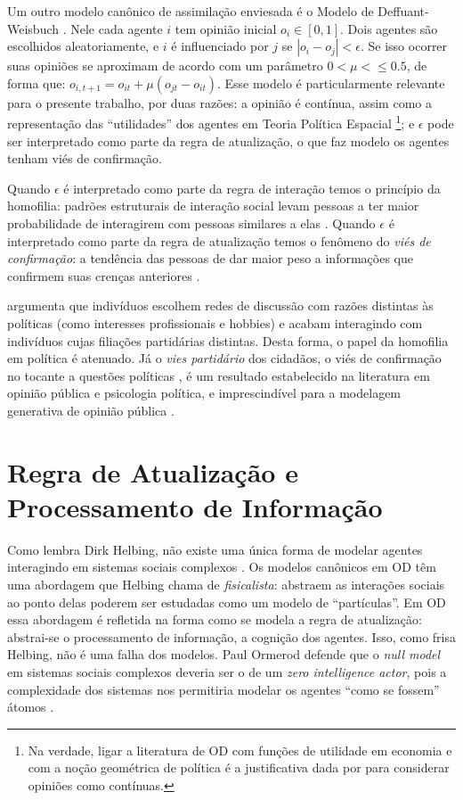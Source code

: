 Um outro modelo canônico de assimilação enviesada é o Modelo de
Deffuant-Weisbuch \cite{deffuant2000mixing}. Nele cada agente \(i\) tem opinião
inicial \( o_i \in [0,1]\). Dois agentes são escolhidos aleatoriamente, e \(i\) é
influenciado por \(j\) se \(| o_i - o_j| < \epsilon\). Se isso ocorrer suas opiniões se
aproximam de acordo com um parâmetro $0 < \mu< \leq 0.5$, de forma que: $o_{i,t+1} =
o_{it} + \mu(o_{jt} - o_{it})$. Esse modelo é particularmente relevante para o
presente trabalho, por duas razões: a opinião é contínua, assim como a
representação das ``utilidades'' dos agentes em Teoria Política Espacial
\footnote{Na verdade, ligar a literatura de OD com funções de utilidade em
  economia e com a noção geométrica de política é a justificativa dada por
   para considerar opiniões como contínuas.}; e
\(\epsilon\) pode ser interpretado como parte da regra de atualização, o que faz modelo
os agentes tenham viés de confirmação.

Quando \(\epsilon\) é interpretado como parte da regra de interação temos o princípio
da homofilia: padrões estruturais de interação social levam pessoas a ter maior
probabilidade de interagirem com pessoas similares a elas
\cite{mcpherson2001birds}. Quando \(\epsilon\) é interpretado como parte da regra de
atualização temos o fenômeno do \textit{viés de confirmação}: a tendência das
pessoas de dar maior peso a informações que confirmem suas crenças anteriores
\cite{nickerson1998confirmation}.

 argumenta que indivíduos escolhem redes de
discussão com razões distintas às políticas (como interesses profissionais e
hobbies) e acabam interagindo com indivíduos cujas filiações partidárias
distintas. Desta forma, o papel da homofilia em política é atenuado. Já o
\textit{vies partidário} dos cidadãos, o viés de confirmação no tocante a
questões políticas , é um resultado estabelecido na literatura em opinião
pública e psicologia política, e imprescindível para a modelagem generativa de
opinião pública \cite{bartels2002beyond, flynn2017nature,
  lodge2013rationalizing}.


\section{Regra de Atualização e Processamento de Informação}


Como lembra Dirk Helbing, não existe uma única forma de modelar agentes
interagindo em sistemas sociais complexos \cite{helbing2010pluralistic}. Os
modelos canônicos em OD têm uma abordagem que Helbing chama de
\textit{fisicalista}: abstraem as interações sociais ao ponto delas poderem ser
estudadas como um modelo de ``partículas''. Em OD essa abordagem é refletida na
forma como se modela a regra de atualização: abstrai-se o processamento de
informação, a cognição dos agentes. Isso, como frisa Helbing, não é uma falha
dos modelos. Paul Ormerod defende que o \textit{null model} em sistemas sociais
complexos deveria ser o de um \textit{zero intelligence actor}, pois a
complexidade dos sistemas nos permitiria modelar os agentes ``como se fossem''
átomos \cite{ormerod2008can, bentley2012agents}.

